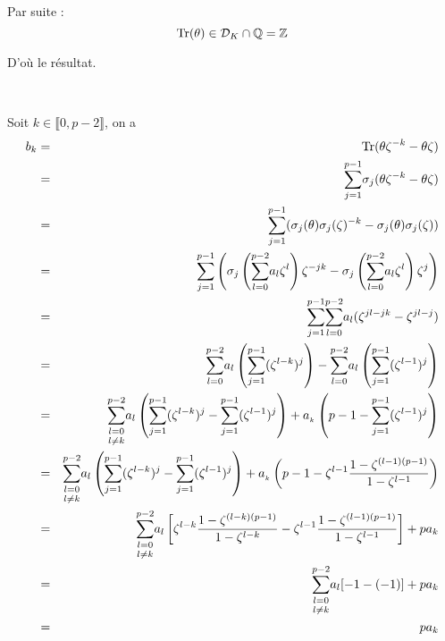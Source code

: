 Par suite :
\[ \operatorname{Tr} (\theta) \in \mathcal{D}_K \cap \mathbb{Q}=\mathbb{Z} \]


D'o{\`u} le r{\'e}sultat.

\

 Soit $k \in \llbracket 0, p - 2 \rrbracket$, on a
\begin{eqnarray*}
  b_k & = & \operatorname{Tr} (\theta \zeta^{- k} - \theta \zeta)\\
  & = & \underset{j = 1}{\overset{p - 1}{\sum}} \sigma_j (\theta \zeta^{- k}
  - \theta \zeta)\\
  & = & \underset{j = 1}{\overset{p - 1}{\sum}} (\sigma_j (\theta) \sigma_j
  (\zeta)^{- k} - \sigma_j (\theta) \sigma_j (\zeta))\\
  & = & \underset{j = 1}{\overset{p - 1}{\sum}} \left( \sigma_j \left(
  \underset{l = 0}{\overset{p - 2}{\sum}} a_l \zeta^l \right) \zeta^{- j k} -
  \sigma_j \left( \underset{l = 0}{\overset{p - 2}{\sum}} a_l \zeta^l \right)
  \zeta^j \right)\\
  & = & \underset{j = 1}{\overset{p - 1}{\sum}} \underset{l = 0}{\overset{p -
  2}{\sum}} a_l (\zeta^{j l - j k} - \zeta^{j l - j})\\
  & = & \underset{l = 0}{\overset{p - 2}{\sum}} a_l \left( \underset{j =
  1}{\overset{p - 1}{\sum}} (\zeta^{l - k})^j \right) - \underset{l =
  0}{\overset{p - 2}{\sum}} a_l \left( \underset{j = 1}{\overset{p - 1}{\sum}}
  (\zeta^{l - 1})^j \right)\\
  & = & \underset{l \neq k}{\underset{l = 0}{\overset{p - 2}{\sum}}} a_l
  \left( \underset{j = 1}{\overset{p - 1}{\sum}} (\zeta^{l - k})^j -
  \underset{j = 1}{\overset{p - 1}{\sum}} (\zeta^{l - 1})^j \right) + a_{_k}
  \left( p - 1 - \underset{j = 1}{\overset{p - 1}{\sum}} (\zeta^{l - 1})^j
  \right)\\
  & = & \underset{l \neq k}{\underset{l = 0}{\overset{p - 2}{\sum}}} a_l
  \left( \underset{j = 1}{\overset{p - 1}{\sum}} (\zeta^{l - k})^j -
  \underset{j = 1}{\overset{p - 1}{\sum}} (\zeta^{l - 1})^j \right) + a_{_k}
  \left( p - 1 - \zeta^{l - 1} \frac{1 - \zeta^{(l - 1) (p - 1)}}{1 - \zeta^{l
  - 1}} \right)\\
  & = & \underset{l \neq k}{\underset{l = 0}{\overset{p - 2}{\sum}}} a_l
  \left[ \zeta^{l - k} \frac{1 - \zeta^{(l - k) (p - 1)}}{1 - \zeta^{l - k}} -
  \zeta^{l - 1} \frac{1 - \zeta^{(l - 1) (p - 1)}}{1 - \zeta^{l - 1}} \right]
  + p a_k\\
  & = & \underset{l \neq k}{\underset{l = 0}{\overset{p - 2}{\sum}}} a_l [- 1
  - (- 1)] + p a_k\\
  & = & p a_k
\end{eqnarray*}


